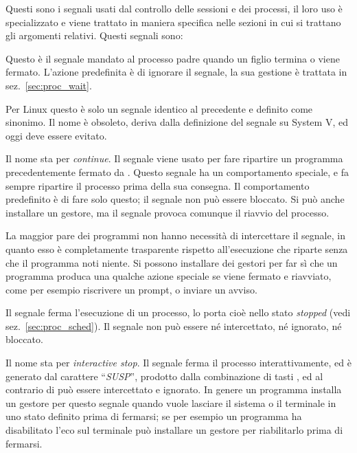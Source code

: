 Questi sono i segnali usati dal controllo delle sessioni e dei processi, il
loro uso è specializzato e viene trattato in maniera specifica nelle sezioni
in cui si trattano gli argomenti relativi.  Questi segnali sono:
\begin{basedescript}{\desclabelwidth{2.0cm}}
\item[\signald{SIGCHLD}] Questo è il segnale mandato al processo padre quando un
  figlio termina o viene fermato. L'azione predefinita è di ignorare il
  segnale, la sua gestione è trattata in sez.~\ref{sec:proc_wait}.

\item[\signald{SIGCLD}] Per Linux questo è solo un segnale identico al
  precedente e definito come sinonimo. Il nome è obsoleto, deriva dalla
  definizione del segnale su System V, ed oggi deve essere evitato.

\item[\signald{SIGCONT}] Il nome sta per \textit{continue}. Il segnale viene
  usato per fare ripartire un programma precedentemente fermato da
  . Questo segnale ha un comportamento speciale, e fa sempre
  ripartire il processo prima della sua consegna. Il comportamento predefinito
  è di fare solo questo; il segnale non può essere bloccato. Si può anche
  installare un gestore, ma il segnale provoca comunque il riavvio del
  processo.
  
  La maggior pare dei programmi non hanno necessità di intercettare il
  segnale, in quanto esso è completamente trasparente rispetto all'esecuzione
  che riparte senza che il programma noti niente. Si possono installare dei
  gestori per far sì che un programma produca una qualche azione speciale
  se viene fermato e riavviato, come per esempio riscrivere un prompt, o
  inviare un avviso. 

\item[\signald{SIGSTOP}] Il segnale ferma l'esecuzione di un processo, lo porta
  cioè nello stato \textit{stopped} (vedi sez.~\ref{sec:proc_sched}). Il
  segnale non può essere né intercettato, né ignorato, né bloccato.

\item[\signald{SIGTSTP}] Il nome sta per \textit{interactive stop}. Il segnale
  ferma il processo interattivamente, ed è generato dal carattere
  ``\textit{SUSP}'', prodotto dalla combinazione di tasti , ed al
  contrario di  può essere intercettato e ignorato. In genere
  un programma installa un gestore per questo segnale quando vuole lasciare il
  sistema o il terminale in uno stato definito prima di fermarsi; se per
  esempio un programma ha disabilitato l'eco sul terminale può installare un
  gestore per riabilitarlo prima di fermarsi.


\end{basedescript}
